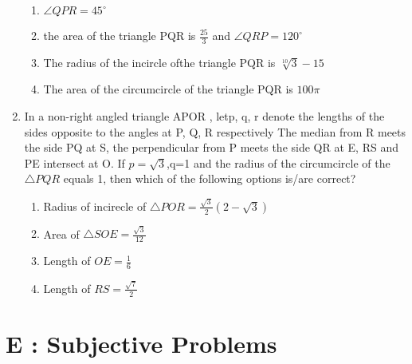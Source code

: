 \documentclass[12pt]{article}
\begin{document}
\begin{enumerate}
\begin{enumerate}
\item $\angle QPR=45^\circ$
\item the area of the triangle PQR is $\frac{25}{3}$ and $\angle QRP=120^\circ$
\item The radius of the incircle ofthe triangle PQR is $\sqrt[10]{3}-15$
\item The area of the circumcircle of the triangle PQR is $100\pi$
\end{enumerate}
\item In a non-right angled triangle APOR , letp, q, r denote the lengths of the sides opposite to the angles at P, Q, R respectively The median from R meets the side PQ at S, the perpendicular from P meets the side QR at E, RS and PE intersect at O. If $p=\sqrt{3}$,q=1 and the radius of the circumcircle of the $\triangle PQR$ equals 1, then which of the following options is/are correct? 
\begin{enumerate}
\item Radius of incirecle of $\triangle POR=\frac{\sqrt{3}}{2}(2-\sqrt{3})$
\item Area of $\triangle SOE=\frac{\sqrt{3}}{12}$
\item Length of $OE=\frac{1}{6}$
\item Length of $RS=\frac{\sqrt{7}}{2}$
\end{enumerate}
\end{enumerate}

\section*{E  :  Subjective Problems}
\end{document}
